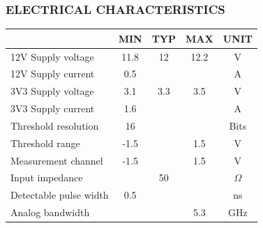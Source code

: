 \subsubsection*{ELECTRICAL CHARACTERISTICS}
\begin{table}[h]
    \begin{tabularx}{\textwidth}{|X|c|c|c|c|}
        \hline
                                       & \textbf{ MIN } & \textbf{ TYP } & \textbf{ MAX } & \textbf{ UNIT } \\\hline
        12V Supply voltage             & 11.8           & 12             & 12.2         & V                 \\\hline
        12V Supply current             & 0.5            &                &              & A                 \\\hline
        3V3 Supply voltage             & 3.1            & 3.3            & 3.5          & V                 \\\hline
        3V3 Supply current             & 1.6            &                &              & A                 \\\hline
        Threshold resolution           & 16             &                &              & Bits              \\\hline
        Threshold range                & -1.5           &                & 1.5          & V                 \\\hline
        Measurement channel            & -1.5           &                & 1.5          & V                 \\\hline
        Input impedance                &                & 50             &              & $\Omega$          \\\hline
        Detectable pulse width         & 0.5            &                &              & ns                \\\hline
        Analog bandwidth               &                &                & 5.3          & GHz               \\\hline
    \end{tabularx}
\end{table}
